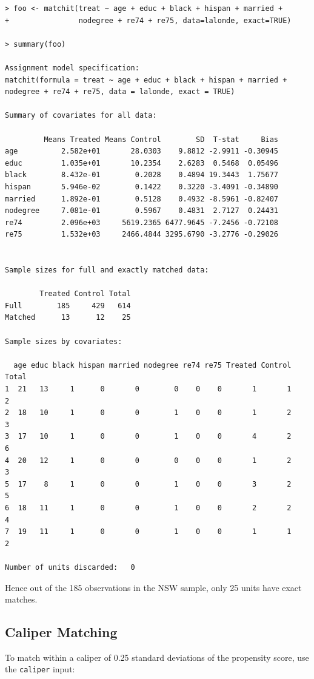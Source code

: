\documentclass[oneside,letterpaper,titlepage]{article}
\begin{document}
\begin{verbatim}
> foo <- matchit(treat ~ age + educ + black + hispan + married +
+                nodegree + re74 + re75, data=lalonde, exact=TRUE)

> summary(foo)
 
Assignment model specification:
matchit(formula = treat ~ age + educ + black + hispan + married +     nodegree + re74 + re75, data = lalonde, exact = TRUE)
 
Summary of covariates for all data:
 
         Means Treated Means Control        SD  T-stat     Bias
age          2.582e+01       28.0303    9.8812 -2.9911 -0.30945
educ         1.035e+01       10.2354    2.6283  0.5468  0.05496
black        8.432e-01        0.2028    0.4894 19.3443  1.75677
hispan       5.946e-02        0.1422    0.3220 -3.4091 -0.34890
married      1.892e-01        0.5128    0.4932 -8.5961 -0.82407
nodegree     7.081e-01        0.5967    0.4831  2.7127  0.24431
re74         2.096e+03     5619.2365 6477.9645 -7.2456 -0.72108
re75         1.532e+03     2466.4844 3295.6790 -3.2776 -0.29026
 
 
Sample sizes for full and exactly matched data:
 
        Treated Control Total
Full        185     429   614
Matched      13      12    25
 
Sample sizes by covariates:
 
  age educ black hispan married nodegree re74 re75 Treated Control Total
1  21   13     1      0       0        0    0    0       1       1     2
2  18   10     1      0       0        1    0    0       1       2     3
3  17   10     1      0       0        1    0    0       4       2     6
4  20   12     1      0       0        0    0    0       1       2     3
5  17    8     1      0       0        1    0    0       3       2     5
6  18   11     1      0       0        1    0    0       2       2     4
7  19   11     1      0       0        1    0    0       1       1     2
 
Number of units discarded:   0
\end{verbatim}


Hence out of the 185 observations in the NSW sample, only 25 units
have exact matches.

\subsection{Caliper Matching}

To match within a caliper of 0.25 standard deviations of the
propensity score, use the \texttt{caliper} input:
\end{document}
